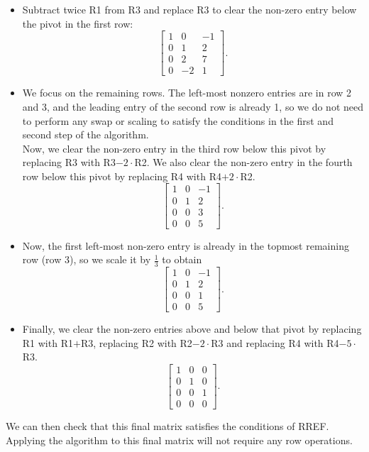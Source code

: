 {\begin{itemize}
     \item Subtract twice R1 from R3 and replace R3 to clear the non-zero entry below the pivot in the first row:
     \[\left[ \begin{array}{ccc} 1 & 0 & -1 \\ 0 & 1 & 2 \\ 0 & 2 & 7 \\ 0 & -2 & 1\end{array} \right]. \]
     
    \item We focus on the remaining rows.  The left-most nonzero entries are in row 2 and 3, and the leading entry of the second row is already 1, so we do not need to perform any swap or scaling to satisfy the conditions in the first and second step of the algorithm.\\
    Now, we clear the non-zero entry in the third row below this pivot by replacing R3 with R3$-2\cdot$R2.  We also clear the non-zero entry in the fourth row below this pivot by replacing R4 with R4$+2\cdot $R2.
     \[\left[ \begin{array}{ccc} 1 & 0 & -1 \\ 0 & 1 & 2 \\ 0 & 0 & 3 \\ 0 & 0 & 5\end{array} \right]. \]
     \item Now, the first left-most non-zero entry is already in the topmost remaining row (row 3), so we scale it by $\frac{1}{3}$ to obtain
     \[\left[ \begin{array}{ccc} 1 & 0 & -1 \\ 0 & 1 & 2 \\ 0 & 0 & 1 \\ 0 & 0 & 5\end{array} \right]. \]
     \item Finally, we clear the non-zero entries above and below that pivot by replacing R1 with R1$+$R3, replacing R2 with R2$-2\cdot$R3 and replacing R4 with R4$-5\cdot$R3.
     \[\left[ \begin{array}{ccc} 1 & 0 & 0 \\ 0 & 1 & 0 \\ 0 & 0 & 1 \\ 0 & 0 & 0\end{array} \right]. \]
     
\end{itemize}
We can then check that this final matrix satisfies the conditions of RREF.  Applying the algorithm to this final matrix will not require any row operations.
}


